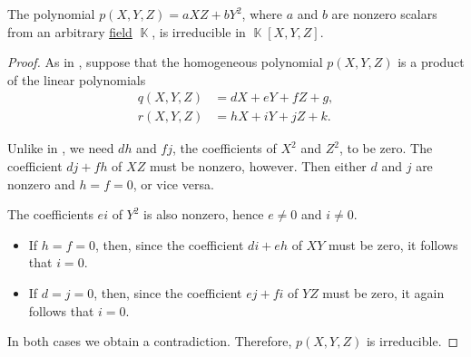 \begin{proposition}\label{thm:axz_byy_irreducible}
  The polynomial \( p(X, Y, Z) = a XZ + b Y^2 \), where \( a \) and \( b \) are nonzero scalars from an arbitrary \hyperref[def:field]{field} \( \BbbK \), is irreducible in \( \BbbK[X, Y, Z] \).
\end{proposition}
\begin{proof}
  As in , suppose that the homogeneous polynomial \( p(X, Y, Z) \) is a product of the linear polynomials
  \begin{align*}
    q(X, Y, Z) &= d X + e Y + f Z + g, \\
    r(X, Y, Z) &= h X + i Y + j Z + k.
  \end{align*}

  Unlike in , we need \( dh \) and \( fj \), the coefficients of \( X^2 \) and \( Z^2 \), to be zero. The coefficient \( dj + fh \) of \( XZ \) must be nonzero, however. Then either \( d \) and \( j \) are nonzero and \( h = f = 0 \), or vice versa.

  The coefficients \( ei \) of \( Y^2 \) is also nonzero, hence \( e \neq 0 \) and \( i \neq 0 \).

  \begin{itemize}
    \item If \( h = f = 0 \), then, since the coefficient \( di + eh \) of \( XY \) must be zero, it follows that \( i = 0 \).

    \item If \( d = j = 0 \), then, since the coefficient \( ej + fi \) of \( YZ \) must be zero, it again follows that \( i = 0 \).
  \end{itemize}

  In both cases we obtain a contradiction. Therefore, \( p(X, Y, Z) \) is irreducible.
\end{proof}
